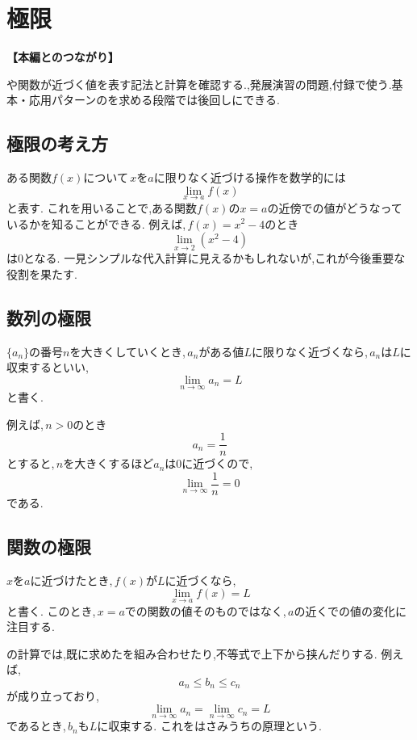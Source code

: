 
\section{極限}\label{節：極限}
  \noindent\textbf{【本編とのつながり】}\par
  や関数が近づく値を表す記法と計算を確認する.,発展演習の問題,付録で使う.基本・応用パターンのを求める段階では後回しにできる.

  \subsection{極限の考え方}\label{節：極限：極限}
    ある関数$f(x)$について\,$x$を$a$に限りなく近づける操作を数学的には
    \[
      \lim_{x\to a} f(x)
    \]
    と表す.
    これを用いることで,ある関数$f(x)$の$x=a$の近傍での値がどうなっているかを知ることができる.
    例えば,\,$f(x)=x^2-4$のとき
    \[
      \lim_{x\to 2} (x^2-4)
    \]
    は$0$となる.
    一見シンプルな代入計算に見えるかもしれないが,これが今後重要な役割を果たす.

  \subsection{数列の極限}\label{節：数列の極限}
    $\{a_n\}$の番号$n$を大きくしていくとき,\,$a_n$がある値$L$に限りなく近づくなら,\,$a_n$は$L$に収束するといい,
    \[
      \lim_{n\to\infty}a_n=L
    \]
    と書く.

    例えば,\,$n>0$のとき
    \[
      a_n=\frac{1}{n}
    \]
    とすると,\,$n$を大きくするほど$a_n$は$0$に近づくので,
    \[
      \lim_{n\to\infty}\frac{1}{n}=0
    \]
    である.

  \subsection{関数の極限}\label{節：関数の極限}
    $x$を$a$に近づけたとき,\,$f(x)$が$L$に近づくなら,
    \[
      \lim_{x\to a}f(x)=L
    \]
    と書く.
    このとき,\,$x=a$での関数の値そのものではなく,\,$a$の近くでの値の変化に注目する.

    の計算では,既に求めたを組み合わせたり,不等式で上下から挟んだりする.
    例えば,
    \[
      a_n\le b_n\le c_n
    \]
    が成り立っており,
    \[
      \lim_{n\to\infty}a_n=\lim_{n\to\infty}c_n=L
    \]
    であるとき,\,$b_n$も$L$に収束する.
    これをはさみうちの原理という.

